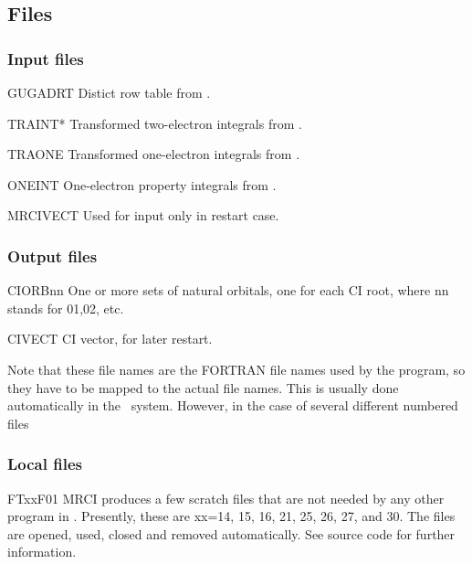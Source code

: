 \subsection{Files}
\label{UG:sec:gugaci_files}
\subsubsection{Input files}

\begin{filelist}
\item[GUGADRT]
{Distict row table from .}
\item[TRAINT*]
{Transformed two-{}electron integrals from .}
\item[TRAONE]
{Transformed one-{}electron integrals from .}
\item[ONEINT]
{One-{}electron property integrals from .}
\item[MRCIVECT]
{Used for input only in restart case.}
\end{filelist}

\subsubsection{Output files}
\begin{filelist}
\item[CIORBnn]
One or more sets of natural orbitals, one for each CI root, where
nn stands for 01,02, etc.
\item[CIVECT]
CI vector, for later restart.
\end{filelist}

Note that these file names are the FORTRAN file names used by the program,
so they have to be mapped to the actual file names. This is usually done
automatically in the \molcas\ system. However, in the case of several
different numbered files

\subsubsection{Local files}
\begin{filelist}
\item[FTxxF01]
MRCI produces a few scratch files that are not needed by any other program
in \molcas. Presently, these are xx=14, 15, 16, 21, 25, 26, 27, and 30.
The files are opened, used, closed and removed automatically.
 See source code for further information.
\end{filelist}

